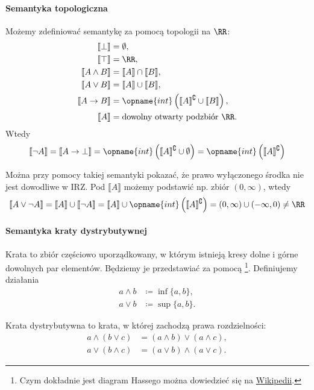 \documentclass[polish,pretty]{angav}
\begin{document}
\paragraph{Semantyka topologiczna}
Możemy zdefiniować semantykę za pomocą topologii na $\RR$:
\begin{align*}
    \llbracket \bot \rrbracket &= \emptyset, \\
    \llbracket \top \rrbracket &= \RR, \\
    \llbracket A \land B \rrbracket &= \llbracket A \rrbracket \cap \llbracket B \rrbracket, \\
    \llbracket A \lor B \rrbracket &= \llbracket A \rrbracket \cup \llbracket B \rrbracket, \\
    \llbracket A \to B \rrbracket &= \opname{int}\left(\llbracket A \rrbracket^\complement \cup \llbracket B \rrbracket\right), \\
    \llbracket A \rrbracket &= \text{dowolny otwarty podzbiór $\RR$.}
\end{align*}
Wtedy
\[ \llbracket \neg A \rrbracket = \llbracket A \to \bot \rrbracket = \opname{int}\left(\llbracket A \rrbracket^\complement \cup \emptyset\right) = \opname{int}\left(\llbracket A \rrbracket^\complement\right) \]

Można przy pomocy takiej semantyki pokazać, że prawo wyłączonego środka nie jest dowodliwe w IRZ. Pod $\llbracket A \rrbracket$ możemy podstawić np. zbiór $(0, \infty)$, wtedy
\[ \llbracket A \lor \neg A \rrbracket = \llbracket A \rrbracket \cup \llbracket \neg A \rrbracket = \llbracket A \rrbracket \cup \opname{int}\left(\llbracket A \rrbracket^\complement\right) = (0, \infty) \cup (-\infty, 0) \neq \RR \]

\paragraph{Semantyka kraty dystrybutywnej}
Krata to zbiór częściowo uporządkowany, w którym istnieją kresy dolne i górne dowolnych par elementów.
Będziemy je przedstawiać za pomocą \footnote{Czym dokładnie jest diagram Hassego można dowiedzieć się na \href{https://pl.wikipedia.org/wiki/Diagram_Hassego}{Wikipedii}.}.
Definiujemy działania
\begin{align*}
    a \land b &\coloneqq \inf\{a, b\}, \\
    a \lor b &\coloneqq \sup\{a, b\}.
\end{align*}

Krata dystrybutywna to krata, w której zachodzą prawa rozdzielności:
\begin{align*}
    a \land (b \lor c) &= (a \land b) \lor (a \land c), \\
    a \lor (b \land c) &= (a \lor b) \land (a \lor c).
\end{align*}
\end{document}
